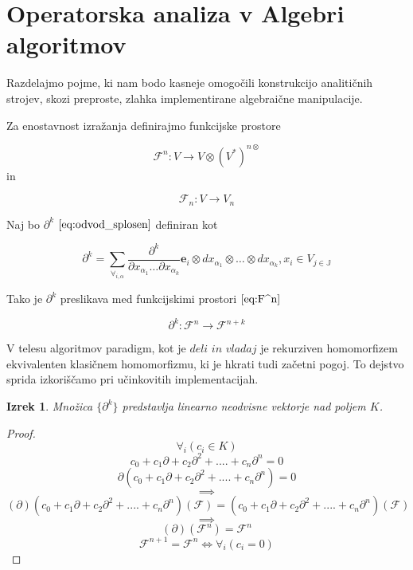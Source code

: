 \documentclass{article}
\newcommand{\JJ}{\mathbb{J}}
\newcommand{\e}{\mathbf{e}}
\newcommand{\F}{\mathcal{F}}
\newcommand{\D}{\partial}
\newtheorem{izrek}{Izrek}[section]
\begin{document}
 \section{Operatorska analiza v Algebri algoritmov}

Razdelajmo pojme, ki nam bodo kasneje omogočili konstrukcijo analitičnih strojev, skozi preproste, zlahka implementirane algebraične manipulacije.

Za enostavnost izražanja definirajmo funkcijske prostore

 \begin{equation}\label{eq:F^n}
 	\F^n:V\to V\otimes(V^*)^{n\otimes}
 \end{equation}
 in
 
 \begin{equation}\label{eq:F_n}
 	\F_n:V\to V_n
 \end{equation}
 
Naj bo $\D^k$ $\eqref{eq:odvod_splosen}$ definiran kot

\begin{equation}\label{eq:dd}
	\partial^k=\sum_{\forall_{i,\alpha}}\frac{\partial^k}{\partial
	    x_{\alpha_1}\ldots \partial x_{\alpha_k}}\e_i\otimes
	  dx_{\alpha_1}\otimes\ldots \otimes dx_{\alpha_k} , x_i\in V_{j\in\JJ}
\end{equation}

Tako je $\D^k$ preslikava med funkcijskimi prostori $\eqref{eq:F^n}$
 
 \begin{equation}\label{eq:toFn+k}
 \D^k:\F^n\to\F^{n+k}
 \end{equation}
 

 V telesu algoritmov paradigm, kot je $\textit{deli in vladaj}$ je rekurziven homomorfizem ekvivalenten klasičnem homomorfizmu, ki je hkrati tudi začetni pogoj. To dejstvo sprida izkoriščamo pri učinkovitih implementacijah.
 
 \begin{izrek}\label{izr:linearnaNeodvisnost}
  Množica $\{\partial^k\}$ predstavlja linearno neodvisne vektorje nad poljem $K$.
 \end{izrek}
 
 \begin{proof} 
 $$\forall_i(c_i\in K)$$
	  $$c_0+c_1\D+c_2\D^2+....+c_n\D^n=0$$
	$$\D(c_0+c_1\D+c_2\D^2+....+c_n\D^n)=0$$
	$$\implies$$
	$$(\D)(c_0+c_1\D+c_2\D^2+....+c_n\D^n)(\F)=(c_0+c_1\D+c_2\D^2+....+c_n\D^n)(\F)$$
	$$\implies$$
	$$(\D)(\F^n)=\F^n$$
	$$\F^{n+1}=\F^n\iff\forall_i(c_i=0)$$
	
 \end{proof}
 
\end{document}
